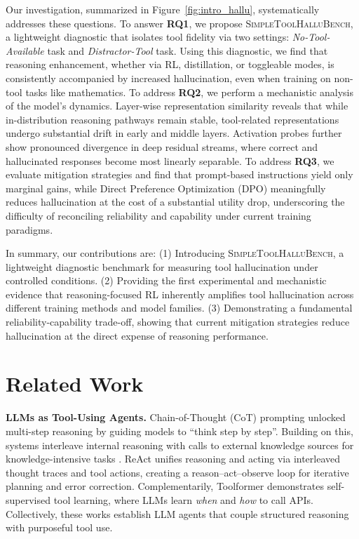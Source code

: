 \documentclass[11pt]{article}
\begin{document}
Our investigation, summarized in Figure~\ref{fig:intro_hallu}, systematically addresses these questions. To answer \textbf{RQ1}, we propose \textsc{SimpleToolHalluBench}, a lightweight diagnostic that isolates tool fidelity via two settings: \emph{No-Tool-Available} task and \emph{Distractor-Tool} task. Using this diagnostic, we find that reasoning enhancement, whether via RL, distillation, or toggleable modes, is consistently accompanied by increased hallucination, even when training on non-tool tasks like mathematics. To address \textbf{RQ2}, we perform a mechanistic analysis of the model's dynamics. Layer-wise representation similarity reveals that while in-distribution reasoning pathways remain stable, tool-related representations undergo substantial drift in early and middle layers. Activation probes further show pronounced divergence in deep residual streams, where correct and hallucinated responses become most linearly separable. To address \textbf{RQ3}, we evaluate mitigation strategies and find that prompt-based instructions yield only marginal gains, while Direct Preference Optimization (DPO) meaningfully reduces hallucination at the cost of a substantial utility drop, underscoring the difficulty of reconciling reliability and capability under current training paradigms.

In summary, our contributions are: (1) Introducing \textsc{SimpleToolHalluBench}, a lightweight diagnostic benchmark for measuring tool hallucination under controlled conditions. (2) Providing the first experimental and mechanistic evidence that reasoning-focused RL inherently amplifies tool hallucination across different training methods and model families. (3) Demonstrating a fundamental reliability-capability trade-off, showing that current mitigation strategies reduce hallucination at the direct expense of reasoning performance.

\section{Related Work}

\textbf{LLMs as Tool-Using Agents.} Chain-of-Thought (CoT) prompting unlocked multi-step reasoning by guiding models to ``think step by step''\citep{wei2022chain}. Building on this, systems interleave internal reasoning with calls to external knowledge sources for knowledge-intensive tasks \citep{trivedi2023interleaving}. ReAct \citep{yao2023react} unifies reasoning and acting via interleaved thought traces and tool actions, creating a reason–act–observe loop for iterative planning and error correction. Complementarily, Toolformer \citep{schick2024toolformer} demonstrates self-supervised tool learning, where LLMs learn \emph{when} and \emph{how} to call APIs. Collectively, these works establish LLM agents that couple structured reasoning with purposeful tool use.
\end{document}
